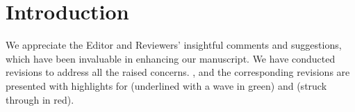 \noindent\hrulefill
{}


\section*{Introduction}
We appreciate the Editor and Reviewers' insightful comments and suggestions, which have been invaluable in enhancing our manuscript. We have conducted revisions to address all the raised concerns.  , and the corresponding revisions are presented with highlights for  (underlined with a wave in green) and  (struck through in red).
